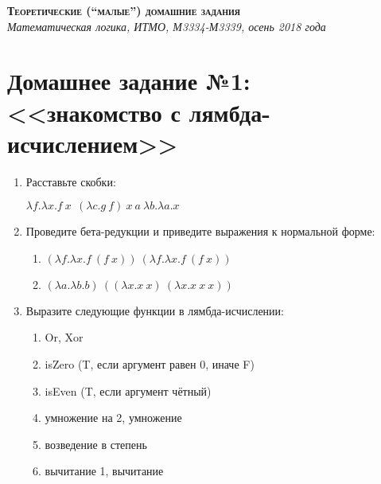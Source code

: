 \documentclass[10pt,a4paper,oneside]{article}
\begin{document}
\begin{center}{\Large\textsc{\textbf{Теоретические (``малые'') домашние задания}}}\\
             \it Математическая логика, ИТМО, М3334-М3339, осень 2018 года\end{center}

\section*{Домашнее задание №1: <<знакомство с лямбда-исчислением>>}

\begin{enumerate}
\item Расставьте скобки:

$\lambda f.\lambda x.f\ x\ \ (\lambda c.g\ f)\ x\ a\ \lambda b.\lambda a.x$

\item Проведите бета-редукции и приведите выражения к нормальной форме:

\begin{enumerate}
\item $(\lambda f.\lambda x.f\ (f\ x))\ (\lambda f.\lambda x.f\ (f\ x))$
\item $(\lambda a.\lambda b.b)\ ((\lambda x.x\ x)\ (\lambda x.x\ x\ x))$
\end{enumerate}

\item Выразите следующие функции в лямбда-исчислении:

\begin{enumerate}
\item Or, Xor
\item isZero (T, если аргумент равен 0, иначе F)
\item isEven (T, если аргумент чётный)
\item умножение на 2, умножение
\item возведение в степень
\item вычитание 1, вычитание
\end{enumerate}
\end{enumerate}
\end{document}
